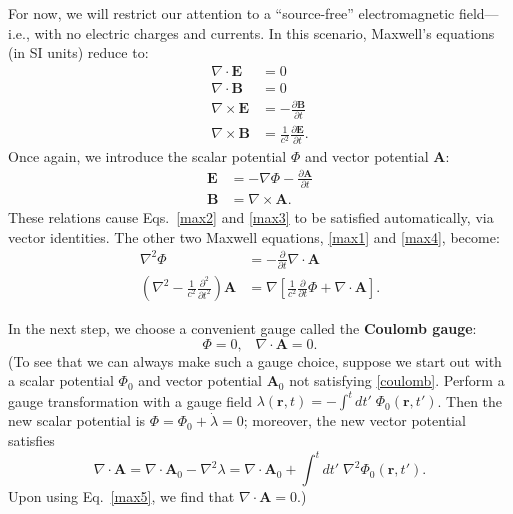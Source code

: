 \documentclass[pra,12pt]{revtex4}
\begin{document}
For now, we will restrict our attention to a ``source-free''
electromagnetic field---i.e., with no electric charges and currents.
In this scenario, Maxwell's equations (in SI units) reduce to:
\begin{align}
  \nabla\cdot \mathbf{E} &= 0 \label{max1} \\
  \nabla\cdot \mathbf{B} &= 0 \label{max2}\\
  \nabla\times \mathbf{E} &= -\frac{\partial \mathbf{B}}{\partial t} \label{max3}\\
  \nabla\times \mathbf{B} &= \frac{1}{c^2} \frac{\partial \mathbf{E}}{\partial t}.
  \label{max4}
\end{align}
Once again, we introduce the scalar potential $\Phi$ and vector
potential $\mathbf{A}$:
\begin{align}
  \mathbf{E} &= - \nabla \Phi - \frac{\partial\mathbf{A}}{\partial t} \\
  \mathbf{B} &= \nabla \times \mathbf{A}.
  \label{Bfield}
\end{align}
These relations cause Eqs.~\eqref{max2} and \eqref{max3} to be
satisfied automatically, via vector identities.  The other two Maxwell
equations, \eqref{max1} and \eqref{max4}, become:
\begin{align}
  \nabla^2 \Phi &= -\frac{\partial}{\partial t} \nabla \cdot \mathbf{A} \label{max5} \\
  \left(\nabla^2 - \frac{1}{c^2}\frac{\partial^2}{\partial t^2}\right)
  \mathbf{A} &= \nabla\left[\frac{1}{c^2}\frac{\partial}{\partial t}  \Phi + \nabla\cdot\mathbf{A}\right]. \label{max6}
\end{align}

In the next step, we choose a convenient gauge called the
\textbf{Coulomb gauge}:
\begin{equation}
  \Phi = 0, \;\;\; \nabla \cdot \mathbf{A} = 0.
  \label{coulomb}
\end{equation}
(To see that we can always make such a gauge choice, suppose we start
out with a scalar potential $\Phi_0$ and vector potential
$\mathbf{A}_0$ not satisfying \eqref{coulomb}.  Perform a gauge
transformation with a gauge field $\lambda(\mathbf{r}, t) = - \int^t
dt'\; \Phi_0(\mathbf{r}, t')$.  Then the new scalar potential is $\Phi
= \Phi_0 + \dot{\lambda} = 0$; moreover, the new vector potential
satisfies
\begin{equation}
  \nabla\cdot\mathbf{A} = \nabla\cdot \mathbf{A}_0 - \nabla^2 \lambda
  = \nabla\cdot \mathbf{A}_0 + \int^t dt'\; \nabla^2\Phi_0(\mathbf{r}, t').
\end{equation}
Upon using Eq.~\eqref{max5}, we find that $\nabla\cdot\mathbf{A} =
0$.)
\end{document}

